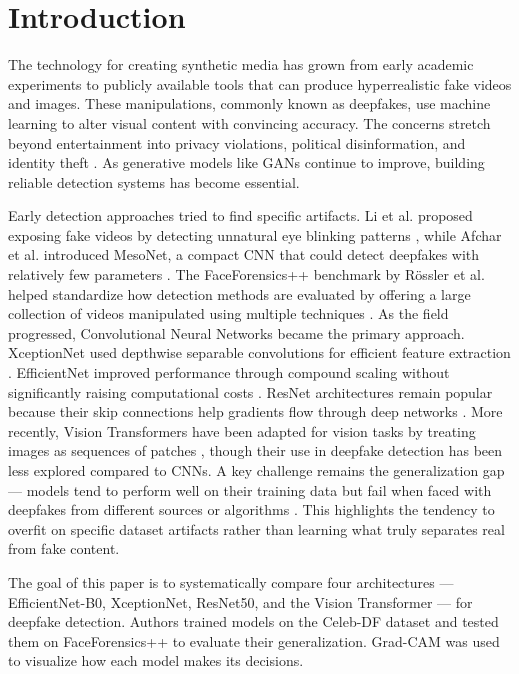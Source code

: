 \documentclass[runningheads]{llncs}
\begin{document}
\section{Introduction}
The technology for creating synthetic media has grown from early academic experiments to publicly available tools that can produce hyperrealistic fake videos and images. These manipulations, commonly known as deepfakes, use machine learning to alter visual content with convincing accuracy. The concerns stretch beyond entertainment into privacy violations, political disinformation, and identity theft \cite{deepfake_survey}. As generative models like GANs continue to improve, building reliable detection systems has become essential.

Early detection approaches tried to find specific artifacts. Li et al. proposed exposing fake videos by detecting unnatural eye blinking patterns \cite{frequency_domain}, while Afchar et al. introduced MesoNet, a compact CNN that could detect deepfakes with relatively few parameters \cite{mesonet}. The FaceForensics++ benchmark by Rössler et al. helped standardize how detection methods are evaluated by offering a large collection of videos manipulated using multiple techniques \cite{faceforensics}. As the field progressed, Convolutional Neural Networks became the primary approach. XceptionNet used depthwise separable convolutions for efficient feature extraction \cite{xception_deepfake}. EfficientNet improved performance through compound scaling without significantly raising computational costs \cite{efficientnet}. ResNet architectures remain popular because their skip connections help gradients flow through deep networks \cite{resnet_deepfake}. More recently, Vision Transformers have been adapted for vision tasks by treating images as sequences of patches \cite{vit}, though their use in deepfake detection has been less explored compared to CNNs. A key challenge remains the generalization gap --- models tend to perform well on their training data but fail when faced with deepfakes from different sources or algorithms \cite{cross_dataset}. This highlights the tendency to overfit on specific dataset artifacts rather than learning what truly separates real from fake content.

The goal of this paper is to systematically compare four architectures --- EfficientNet-B0, XceptionNet, ResNet50, and the Vision Transformer --- for deepfake detection. Authors trained models on the Celeb-DF dataset and tested them on FaceForensics++ to evaluate their generalization. Grad-CAM was used to visualize how each model makes its decisions.
\end{document}
